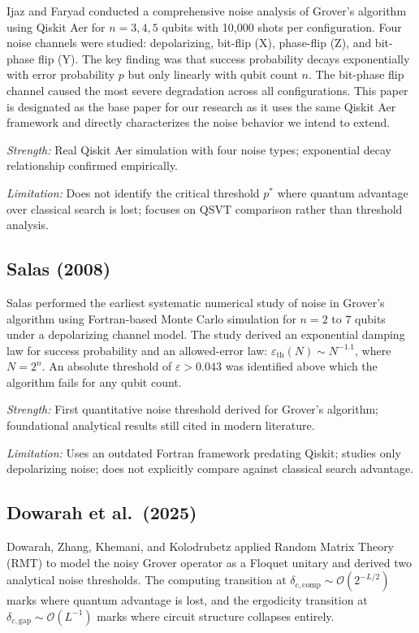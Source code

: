 \documentclass[12pt, a4paper]{article}
\begin{document}
Ijaz and Faryad conducted a comprehensive noise analysis of Grover's algorithm
using Qiskit Aer for $n = 3, 4, 5$ qubits with 10{,}000 shots per configuration.
Four noise channels were studied: depolarizing, bit-flip (X), phase-flip (Z), and
bit-phase flip (Y). The key finding was that success probability decays
exponentially with error probability $p$ but only linearly with qubit count $n$.
The bit-phase flip channel caused the most severe degradation across all
configurations. This paper is designated as the base paper for our research as it
uses the same Qiskit Aer framework and directly characterizes the noise behavior we
intend to extend.

\textit{Strength:} Real Qiskit Aer simulation with four noise types; exponential
decay relationship confirmed empirically.

\textit{Limitation:} Does not identify the critical threshold $p^{*}$ where
quantum advantage over classical search is lost; focuses on QSVT comparison rather
than threshold analysis.

\subsection*{Salas (2008)}

Salas performed the earliest systematic numerical study of noise in Grover's
algorithm using Fortran-based Monte Carlo simulation for $n = 2$ to $7$ qubits
under a depolarizing channel model. The study derived an exponential damping law
for success probability and an allowed-error law:
$\varepsilon_{\text{th}}(N) \sim N^{-1.1}$, where $N = 2^{n}$. An absolute
threshold of $\varepsilon > 0.043$ was identified above which the algorithm fails
for any qubit count.

\textit{Strength:} First quantitative noise threshold derived for Grover's
algorithm; foundational analytical results still cited in modern literature.

\textit{Limitation:} Uses an outdated Fortran framework predating Qiskit; studies
only depolarizing noise; does not explicitly compare against classical search
advantage.

\subsection*{Dowarah et al.\ (2025)}

Dowarah, Zhang, Khemani, and Kolodrubetz applied Random Matrix Theory (RMT) to
model the noisy Grover operator as a Floquet unitary and derived two analytical
noise thresholds. The computing transition at
$\delta_{c,\text{comp}} \sim \mathcal{O}(2^{-L/2})$ marks where quantum advantage
is lost, and the ergodicity transition at
$\delta_{c,\text{gap}} \sim \mathcal{O}(L^{-1})$ marks where circuit structure
collapses entirely.
\end{document}
